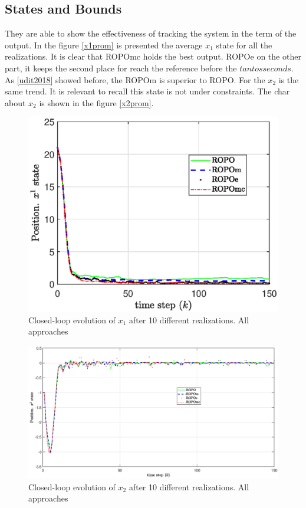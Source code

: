 \documentclass{ifacconf}
\begin{document}
\subsection{States and Bounds}
They are able to show the effectiveness of tracking the system in the term of the output. In the figure \ref{x1prom} is presented the average $x_{1}$ state for all the realizations. It is clear that ROPOmc holds the best output. ROPOe on the other part, it keeps the second place for reach the reference before the $tantos seconds$. As \ref{udit2018} showed before, the ROPOm is superior to ROPO. For the $x_2$ is the same trend. It is relevant to recall this state is not under constraints. The char about $x_2$ is shown in the figure \ref{x2prom}.
\begin{figure}
  \centering
  \includegraphics[width=0.95\linewidth]{x1prom}
  \caption{Closed-loop evolution of $x_{1}$ after 10 different realizations. All approaches}
  \label{fig:x1prom}
\end{figure}
\begin{figure}
  \centering
  \includegraphics[width=0.95\linewidth]{x2prom}
  \caption{Closed-loop evolution of $x_{2}$ after 10 different realizations. All approaches}
  \label{fig:x2prom}
\end{figure}
\end{document}
